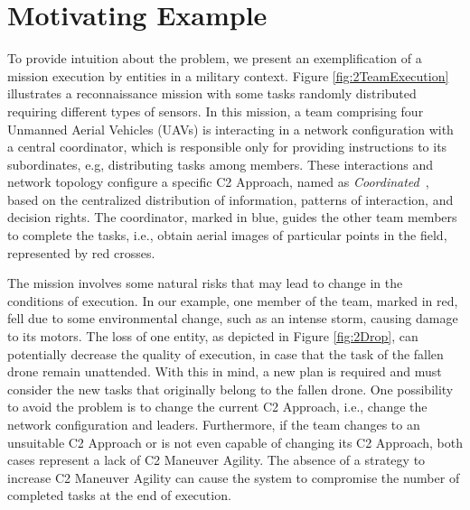 \section{Motivating Example}
\label{sec:motivation}

To provide intuition about the problem, we present an exemplification of a mission execution by entities in a military context. Figure \ref{fig:2TeamExecution} illustrates a reconnaissance mission with some tasks randomly distributed requiring different types of sensors. In this mission, a team comprising four Unmanned Aerial Vehicles (UAVs) is interacting in a network configuration with a central coordinator, which is responsible only for providing instructions to its subordinates, e.g, distributing tasks among members. These interactions and network topology configure a specific C2 Approach, named as \textit{Coordinated}~\citep{france2014}, based on the centralized distribution of information, patterns of interaction, and decision rights. The coordinator, marked in blue, guides the other team members to complete the tasks, i.e., obtain aerial images of particular points in the field, represented by red crosses.

The mission involves some natural risks that may lead to change in the conditions of execution. In our example, one member of the team, marked in red, fell due to some environmental change, such as an intense storm, causing damage to its motors. The loss of one entity, as depicted in Figure \ref{fig:2Drop}, can potentially decrease the quality of execution, in case that the task of the fallen drone remain unattended. With this in mind, a new plan is required and must consider the new tasks that originally belong to the fallen drone. One possibility to avoid the problem is to change the current C2 Approach, i.e., change the network configuration and leaders. Furthermore, if the team changes to an unsuitable C2 Approach or is not even capable of changing its C2 Approach, both cases represent a lack of C2 Maneuver Agility. The absence of a strategy to increase C2 Maneuver Agility can cause the system to compromise the number of completed tasks at the end of execution. 

